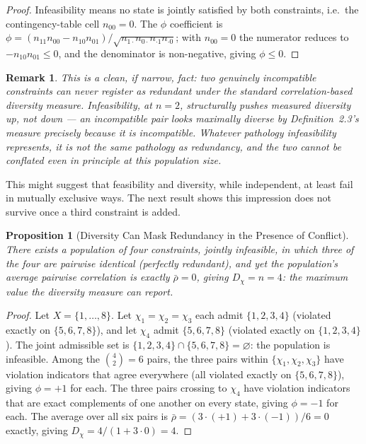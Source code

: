 \documentclass[11pt]{article}
\newtheorem{proposition}[definition]{Proposition}
\newtheorem*{remark}{Remark}
\begin{document}
\begin{proof}
Infeasibility means no state is jointly satisfied by both constraints, i.e.\ the contingency-table cell $n_{00}=0$. The $\phi$ coefficient is $\phi = (n_{11}n_{00}-n_{10}n_{01})/\sqrt{n_{1\cdot}n_{0\cdot}n_{\cdot1}n_{\cdot0}}$; with $n_{00}=0$ the numerator reduces to $-n_{10}n_{01}\leq0$, and the denominator is non-negative, giving $\phi\leq0$.
\end{proof}

\begin{remark}
This is a clean, if narrow, fact: two genuinely incompatible constraints can never register as redundant under the standard correlation-based diversity measure. Infeasibility, at $n=2$, structurally pushes measured diversity up, not down — an incompatible pair looks maximally diverse by Definition~2.3's measure precisely because it is incompatible. Whatever pathology infeasibility represents, it is not the same pathology as redundancy, and the two cannot be conflated even in principle at this population size.
\end{remark}

This might suggest that feasibility and diversity, while independent, at least fail in mutually exclusive ways. The next result shows this impression does not survive once a third constraint is added.

\begin{proposition}[Diversity Can Mask Redundancy in the Presence of Conflict]
\label{prop:masking}
There exists a population of four constraints, jointly infeasible, in which three of the four are pairwise identical (perfectly redundant), and yet the population's average pairwise correlation is exactly $\bar\rho=0$, giving $D_\chi=n=4$: the maximum value the diversity measure can report.
\end{proposition}

\begin{proof}
Let $X=\{1,\dots,8\}$. Let $\chi_1=\chi_2=\chi_3$ each admit $\{1,2,3,4\}$ (violated exactly on $\{5,6,7,8\}$), and let $\chi_4$ admit $\{5,6,7,8\}$ (violated exactly on $\{1,2,3,4\}$). The joint admissible set is $\{1,2,3,4\}\cap\{5,6,7,8\}=\varnothing$: the population is infeasible. Among the $\binom{4}{2}=6$ pairs, the three pairs within $\{\chi_1,\chi_2,\chi_3\}$ have violation indicators that agree everywhere (all violated exactly on $\{5,6,7,8\}$), giving $\phi=+1$ for each. The three pairs crossing to $\chi_4$ have violation indicators that are exact complements of one another on every state, giving $\phi=-1$ for each. The average over all six pairs is $\bar\rho = (3\cdot(+1) + 3\cdot(-1))/6 = 0$ exactly, giving $D_\chi = 4/(1+3\cdot0) = 4$.
\end{proof}
\end{document}
